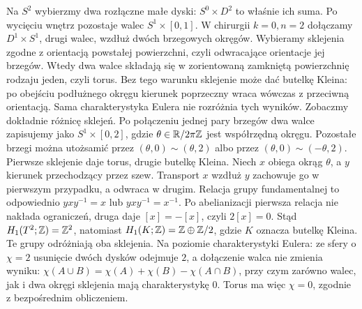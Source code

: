\begin{przyklad}
Na $S^2$ wybierzmy
dwa rozłączne
małe dyski:
$S^0\times D^2$
to właśnie ich suma.
Po wycięciu wnętrz
pozostaje walec
$S^1\times[0,1]$.
W chirurgii
$k=0,n=2$
dołączamy
$D^1\times S^1$,
drugi walec,
wzdłuż dwóch
brzegowych okręgów.
Wybieramy sklejenia zgodne z orientacją powstałej
powierzchni, czyli odwracające orientacje jej brzegów.
Wtedy dwa walce składają się w zorientowaną zamkniętą
powierzchnię rodzaju jeden, czyli torus. Bez tego
warunku sklejenie może dać butelkę Kleina:
po obejściu podłużnego okręgu kierunek poprzeczny
wraca wówczas z przeciwną orientacją. Sama
charakterystyka Eulera nie rozróżnia tych wyników.
Zobaczmy dokładnie różnicę sklejeń. Po połączeniu
jednej pary brzegów dwa walce zapisujemy jako
$S^1\times[0,2]$, gdzie $\theta\in\mathbb{R}/2\pi\mathbb{Z}$
jest współrzędną okręgu. Pozostałe brzegi można utożsamić
przez $(\theta,0)\sim(\theta,2)$ albo przez
$(\theta,0)\sim(-\theta,2)$.
Pierwsze sklejenie daje torus, drugie butelkę Kleina.
Niech $x$ obiega okrąg $\theta$, a $y$ kierunek
przechodzący przez szew. Transport $x$ wzdłuż $y$
zachowuje go w pierwszym przypadku, a odwraca w drugim.
Relacja grupy fundamentalnej to odpowiednio
$yxy^{-1}=x$ lub $yxy^{-1}=x^{-1}$.
Po abelianizacji pierwsza relacja nie nakłada
ograniczeń, druga daje $[x]=-[x]$, czyli $2[x]=0$.
Stąd $H_1(T^2;\mathbb{Z})=\mathbb{Z}^2$, natomiast
$H_1(K;\mathbb{Z})=\mathbb{Z}\oplus\mathbb{Z}/2$, gdzie $K$ oznacza butelkę Kleina.
Te grupy odróżniają oba sklejenia.
Na poziomie
charakterystyki
Eulera: ze sfery
o $\chi=2$ usunięcie
dwóch dysków
odejmuje $2$,
a dołączenie walca nie zmienia wyniku:
$\chi(A\cup B)=\chi(A)+\chi(B)-\chi(A\cap B)$,
przy czym zarówno walec, jak i dwa okręgi sklejenia
mają charakterystykę $0$.
Torus ma więc
$\chi=0$, zgodnie
z bezpośrednim
obliczeniem.
\end{przyklad}


